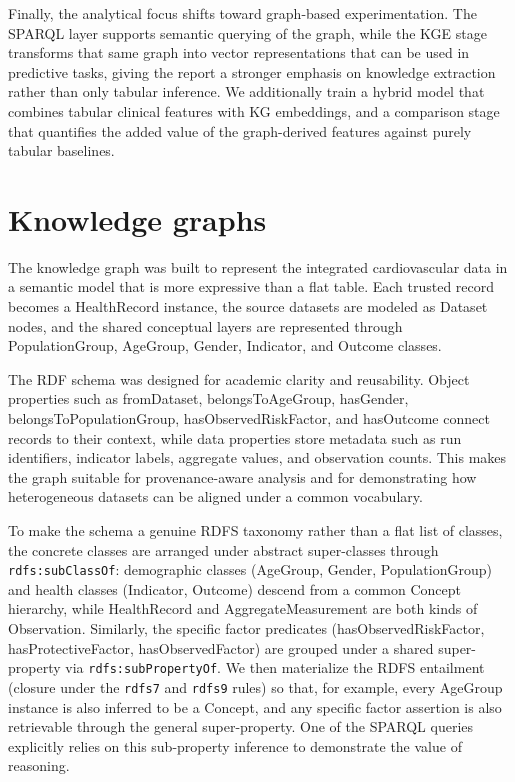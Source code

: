 \documentclass[11pt,a4paper]{article}
\begin{document}
Finally, the analytical focus shifts toward graph-based experimentation. The SPARQL layer supports semantic querying of the graph, while the KGE stage transforms that same graph into vector representations that can be used in predictive tasks, giving the report a stronger emphasis on knowledge extraction rather than only tabular inference. We additionally train a hybrid model that combines tabular clinical features with KG embeddings, and a comparison stage that quantifies the added value of the graph-derived features against purely tabular baselines.

\section{Knowledge graphs}
The knowledge graph was built to represent the integrated cardiovascular data in a semantic model that is more expressive than a flat table. Each trusted record becomes a HealthRecord instance, the source datasets are modeled as Dataset nodes, and the shared conceptual layers are represented through PopulationGroup, AgeGroup, Gender, Indicator, and Outcome classes.

The RDF schema was designed for academic clarity and reusability. Object properties such as fromDataset, belongsToAgeGroup, hasGender, belongsToPopulationGroup, hasObservedRiskFactor, and hasOutcome connect records to their context, while data properties store metadata such as run identifiers, indicator labels, aggregate values, and observation counts. This makes the graph suitable for provenance-aware analysis and for demonstrating how heterogeneous datasets can be aligned under a common vocabulary.

To make the schema a genuine RDFS taxonomy rather than a flat list of classes, the concrete classes are arranged under abstract super-classes through \texttt{rdfs:subClassOf}: demographic classes (AgeGroup, Gender, PopulationGroup) and health classes (Indicator, Outcome) descend from a common Concept hierarchy, while HealthRecord and AggregateMeasurement are both kinds of Observation. Similarly, the specific factor predicates (hasObservedRiskFactor, hasProtectiveFactor, hasObservedFactor) are grouped under a shared super-property via \texttt{rdfs:subPropertyOf}. We then materialize the RDFS entailment (closure under the \texttt{rdfs7} and \texttt{rdfs9} rules) so that, for example, every AgeGroup instance is also inferred to be a Concept, and any specific factor assertion is also retrievable through the general super-property. One of the SPARQL queries explicitly relies on this sub-property inference to demonstrate the value of reasoning.
\end{document}
